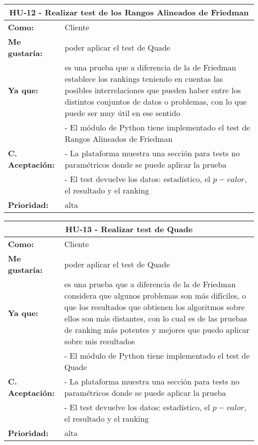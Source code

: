 
\begin{table}[H]
	\begin{tabular}{| p{3cm}| p{11cm} |}
		\hline
		\multicolumn{2}{|c|}{\textbf{HU-12} - Realizar test de los Rangos Alineados de Friedman} \\ \hline
		\textbf{Como:} & Cliente \\ \hline
		\textbf{Me gustaría:} & poder aplicar el test de Quade \\ \hline
		\textbf{Ya que:} & es una prueba que a diferencia de la de Friedman establece los rankings teniendo en cuentas las posibles interrelaciones que pueden haber entre los distintos conjuntos de datos o problemas, con lo que puede ser muy útil en ese sentido \\ \hline
		\multirow{3}{11cm}{\textbf{C. Aceptación:}} & - El módulo de Python tiene implementado el test de Rangos Alineados de Friedman \\
		& - La plataforma muestra una sección para tests no paramétricos donde se puede aplicar la prueba \\
		& - El test devuelve los datos: estadístico, el $p-valor$, el resultado y el ranking \\ \hline
		\textbf{\textbf{Prioridad:}} & alta \\ \hline
	\end{tabular}
\end{table}


\begin{table}[H]
	\begin{tabular}{| p{3cm}| p{11cm} |}
		\hline
		\multicolumn{2}{|c|}{\textbf{HU-13} - Realizar test de Quade} \\ \hline
		\textbf{Como:} & Cliente \\ \hline
		\textbf{Me gustaría:} & poder aplicar el test de Quade \\ \hline
		\textbf{Ya que:} & es una prueba que a diferencia de la de Friedman considera que algunos problemas son más difíciles, o que los resultados que obtienen los algoritmos sobre ellos son más distantes, con lo cual es de las pruebas de ranking más potentes y mejores que puedo aplicar sobre mis resultados \\ \hline
		\multirow{3}{11cm}{\textbf{C. Aceptación:}} & - El módulo de Python tiene implementado el test de Quade \\
		& - La plataforma muestra una sección para tests no paramétricos donde se puede aplicar la prueba \\
		& - El test devuelve los datos: estadístico, el $p-valor$, el resultado y el ranking \\ \hline
		\textbf{\textbf{Prioridad:}} & alta \\ \hline
	\end{tabular}
\end{table}

